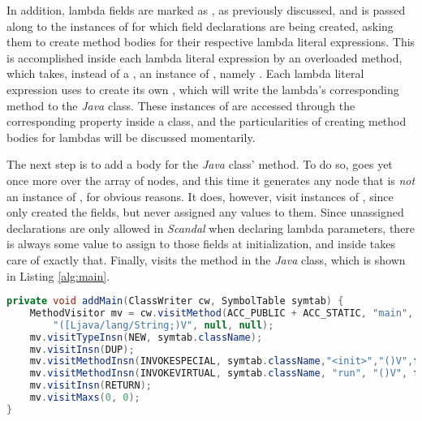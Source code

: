 In addition, lambda fields are marked as , as previously discussed, and  is passed along to the instances of  for which field declarations are being created, asking them to create method bodies for their respective lambda literal expressions. This is accomplished inside each lambda literal expression by an overloaded  method, which takes, instead of a , an instance of , namely . Each lambda literal expression uses  to create its own , which will write the lambda's corresponding method to the \emph{Java} class. These instances of  are accessed through the corresponding  property inside a  class, and the particularities of creating method bodies for lambdas will be discussed momentarily.

The next step is to add a body for the \emph{Java} class'  method. To do so,  goes yet once more over the array of nodes, and this time it generates any node that is \emph{not} an instance of , for obvious reasons. It does, however, visit instances of , since  only created the fields, but never assigned any values to them. Since unassigned declarations are only allowed in \emph{Scandal} when declaring lambda parameters, there is always some value to assign to those fields at initialization, and  inside  takes care of exactly that. Finally,  visits the  method in the \emph{Java} class, which is shown in Listing \ref{alg:main}.

\begin{lstlisting}[language=Java,caption={Using the ASM framework to construct a \il{main} method.},label={alg:main}]
private void addMain(ClassWriter cw, SymbolTable symtab) {
	MethodVisitor mv = cw.visitMethod(ACC_PUBLIC + ACC_STATIC, "main",
		"([Ljava/lang/String;)V", null, null);
	mv.visitTypeInsn(NEW, symtab.className);
	mv.visitInsn(DUP);
	mv.visitMethodInsn(INVOKESPECIAL, symtab.className,"<init>","()V",false);
	mv.visitMethodInsn(INVOKEVIRTUAL, symtab.className, "run", "()V", false);
	mv.visitInsn(RETURN);
	mv.visitMaxs(0, 0);
}
\end{lstlisting}

